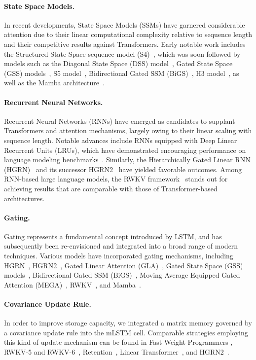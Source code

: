 \paragraph{State Space Models.} In recent developments, State Space Models (SSMs) have garnered considerable attention due to their linear computational complexity relative to sequence length and their competitive results against Transformers. Early notable work includes the Structured State Space sequence model (S4)~\citep{Gu:21}, which was soon followed by models such as the Diagonal State Space (DSS) model~\citep{Gupta:22}, Gated State Space (GSS) models~\citep{Mehta:22}, S5 model~\citep{Smith:22}, Bidirectional Gated SSM (BiGS)~\citep{Wang:22}, H3 model~\citep{Fu:23}, as well as the Mamba architecture~\citep{Gu:24arxiv}.

\paragraph{Recurrent Neural Networks.} Recurrent Neural Networks (RNNs) have emerged as candidates to supplant Transformers and attention mechanisms, largely owing to their linear scaling with sequence length. Notable advances include RNNs equipped with Deep Linear Recurrent Units (LRUs), which have demonstrated encouraging performance on language modeling benchmarks~\citep{Orvieto:23, De:24arxiv}. Similarly, the Hierarchically Gated Linear RNN (HGRN)~\citep{Qin:23} and its successor HGRN2~\citep{Qin:24arxiv} have yielded favorable outcomes. Among RNN-based large language models, the RWKV framework~\citep{Peng:23arxivshort,Peng:24arxivshort} stands out for achieving results that are comparable with those of Transformer-based architectures.

\paragraph{Gating.}
Gating represents a fundamental concept introduced by LSTM, and has subsequently been re-envisioned and integrated into a broad range of modern techniques. Various models have incorporated gating mechanisms, including HGRN~\citep{Qin:23}, HGRN2~\citep{Qin:24arxiv}, Gated Linear Attention (GLA)~\citep{Yang:23arxiv}, Gated State Space (GSS) models~\citep{Mehta:22}, Bidirectional Gated SSM (BiGS)~\citep{Wang:22}, Moving Average Equipped Gated Attention (MEGA)~\citep{Ma:22}, RWKV~\citep{Peng:23arxivshort}, and Mamba~\citep{Gu:24arxiv}.

\paragraph{Covariance Update Rule.} In order to improve storage capacity, we integrated a matrix memory governed by a covariance update rule into the mLSTM cell. Comparable strategies employing this kind of update mechanism can be found in Fast Weight Programmers \citep{Schmidhuber:92ncfastweights,Schlag:21}, RWKV-5 and RWKV-6~\citep{Peng:24arxivshort}, Retention~\citep{Sun:23arxiv}, Linear Transformer~\citep{Katharopoulos:20}, and HGRN2~\citep{Qin:24arxiv}.

